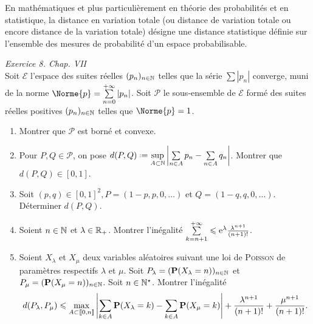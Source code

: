 En mathématiques et plus particulièrement en théorie des probabilités et en statistique, la distance en variation totale (ou distance de variation totale ou encore distance de la variation totale) désigne une distance statistique définie sur l'ensemble des mesures de probabilité d'un espace probabilisable. 

\begin{exercice}
\emph{Exercice 8. Chap. VII} \\
Soit $\mathscr{E}$ l'espace des suites réelles $(p_n)_{n \in \N}$ telles que la série $\sum |p_n|$ converge, muni de la norme $\Norme{p} = \sum\limits_{n=0}^{+\infty} |p_n|$. Soit $\mathscr{P}$ le sous-ensemble de $\mathscr{E}$ formé des suites réelles positives $(p_n)_{n \in \N}$ telles que $\Norme{p}=1$.
\begin{enumerate}
    \item Montrer que $\mathscr{P}$ est borné et convexe. \\
    \item Pour $P, Q \in \mathscr{P}$, on pose $d(P, Q) \defeq \sup\limits_{A \subset \N} \left| \sum\limits_{n \in A} p_n - \sum\limits_{n \in A} q_n \right|$. Montrer que $d(P,Q) \in [0,1]$.
    \item Soit $(p,q) \in [0, 1]^2, P = (1-p, p, 0, \dots)$ et $Q = (1-q, q, 0, \dots)$. Déterminer $d(P, Q)$.
    \item Soient $n \in \N$ et $\lambda \in \Rp$. Montrer l'inégalité $\sum\limits_{k=n+1}^{+\infty} \leqslant \me^{\lambda} \frac{\lambda^{n+1}}{(n+1)!}$.
    \item Soient $X_\lambda$ et $X_\mu$ deux variables aléatoires suivant une loi de \textsc{Poisson} de paramètres respectifs $\lambda$ et $\mu$. Soit $P_\lambda = (\P(X_\lambda=n))_{n \in \N}$ et $P_\mu = (\P(X_\mu=n))_{n \in \N}$. Soit $n \in \Ne$. Montrer l'inégalité
    $$d(P_\lambda, P_\mu) \leqslant \max_{A \subset \llbracket 0, n \rrbracket} \left| \sum_{k \in A} \P(X_\lambda=k) - \sum_{k \in A} \P(X_\mu=k) \right| + \frac{\lambda^{n+1}}{(n+1)!} + \frac{\mu^{n+1}}{(n+1)!}.$$
\end{enumerate}
\end{exercice}


